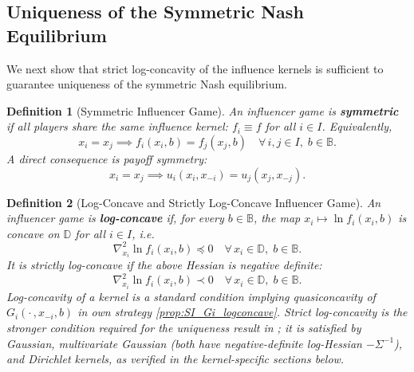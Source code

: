 \documentclass{article}
\newtheorem{definition}{Definition}
\begin{document}
        \subsection{Uniqueness of the Symmetric Nash Equilibrium}
            We next show that strict log-concavity of the influence kernels is sufficient to guarantee uniqueness of the symmetric Nash equilibrium. 
            \begin{definition}[Symmetric Influencer Game]\label{def:SI_symmetric_influencers}
                An influencer game is \textbf{symmetric} if all players share the same influence kernel: $f_i \equiv f$ for all $i\in I$. Equivalently,
                \begin{equation}
                    x_i=x_j \implies f_i(x_i,b)=f_j(x_j,b) \quad\forall\, i,j\in I,\; b\in\mathbb{B}.
                \end{equation}
                A direct consequence is payoff symmetry:
                \begin{equation}\label{eq:SI_symmetric_payoff}
                    x_i=x_j \implies u_i(x_i,x_{-i})=u_{j}(x_j,x_{-j}).
                \end{equation}
            \end{definition}
            \begin{definition}[Log-Concave and Strictly Log-Concave Influencer Game]\label{def:SI_log-concave_influencers}
                An influencer game is \textbf{log-concave} if, for every $b\in\mathbb{B}$, the map $x_i\mapsto\ln f_i(x_i,b)$ is concave on $\mathbb{D}$ for all $i\in I$, i.e.
                \begin{equation}
                    \nabla^2_{x_i}\ln f_i(x_i,b) \preceq 0 \quad \forall\, x_i\in\mathbb{D},\; b\in\mathbb{B}.
                \end{equation}
                It is strictly log-concave if the above Hessian is negative definite:
                \begin{equation}
                    \nabla^2_{x_i}\ln f_i(x_i,b) \prec 0 \quad \forall\, x_i\in\mathbb{D},\; b\in\mathbb{B}.
                \end{equation}
                Log-concavity of a kernel is a standard condition implying quasiconcavity of $G_i(\cdot\,,x_{-i},b)$ in own strategy \cref{prop:SI_Gi_logconcave}. Strict log-concavity is the stronger condition required for the uniqueness result in ; it is satisfied by Gaussian, multivariate Gaussian (both have negative-definite log-Hessian $-\Sigma^{-1}$), and Dirichlet kernels, as verified in the kernel-specific sections below.
            \end{definition}
            
\end{document}
